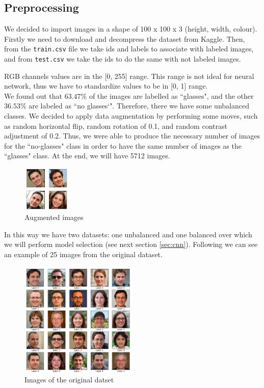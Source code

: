 \documentclass{article}
\begin{document}
\subsection{Preprocessing}
We decided to import images in a shape of 100 x 100 x 3 (height, width, colour). Firstly we need to download and decompress the dataset from Kaggle. Then, from the \texttt{train.csv} file we take ids and labels to associate with labeled images, and from \texttt{test.csv} we take the ids to do the same with not labeled images.

RGB channels values are in the [0, 255] range. This range is not ideal for neural network, thus we have to standardize values to be in [0, 1] range.
\\

We found out that $63.47\%$ of the images are labelled as ``glasses", and the other  $36.53\%$ are labeled as ``no glasses`". Therefore, there we have some unbalanced classes. We decided to apply data augmentation by performing some moves, such as random horizontal flip, random rotation of 0.1, and random contrast adjustment of 0.2. Thus, we were able to produce the necessary number of images for the ``no-glasses" class in order to have the same number of images as the ``glasses" class. At the end, we will have 5712 images. 

\begin{figure}[h]
    \centering
    \includegraphics[width=0.2\textwidth]{images/augm_imgs.png}
    \caption{Augmented images}
    \label{fig:augm_imgs}
\end{figure}

In this way we have two datasets: one unbalanced and one balanced over which we will perform model selection (see next section \ref{sec:cnn}).
Following we can see an example of 25 images from the original dataset.

\begin{figure}[H]
    \centering
    \includegraphics[width=0.5\textwidth]{images/images.png}
    \caption{Images of the original datset}
    \label{fig:train_images}
\end{figure}
\end{document}
